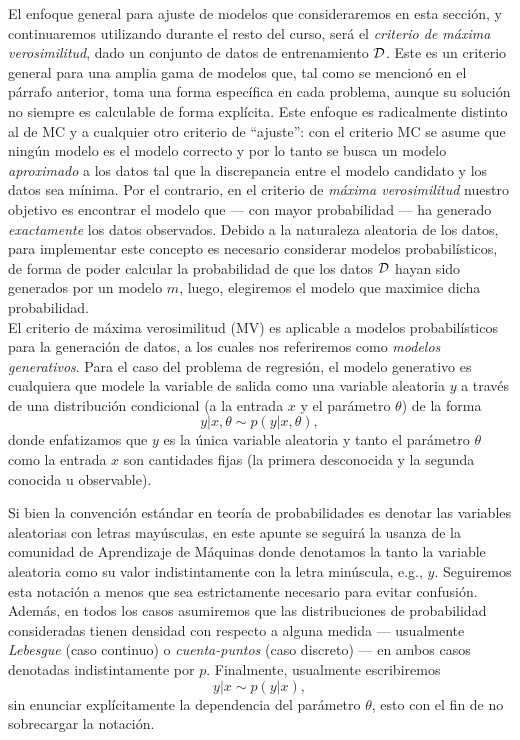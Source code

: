 El enfoque general para ajuste de modelos que consideraremos en esta sección, y continuaremos utilizando durante el resto del curso, será el \emph{criterio  de máxima verosimilitud}, dado un conjunto de datos de entrenamiento ${\mathcal D}$. Este es un criterio general para una amplia gama de modelos que, tal como se mencionó en el párrafo anterior, toma una  forma específica en cada problema, aunque su solución no siempre es calculable de forma explícita. Este enfoque es radicalmente distinto al de MC y a cualquier otro criterio de ``ajuste'': con el criterio MC se asume que ningún modelo es el modelo correcto y por lo tanto se busca un modelo \emph{aproximado} a los datos tal que la discrepancia entre el modelo candidato y los datos sea mínima. Por el contrario, en el criterio de \emph{máxima verosimilitud} nuestro objetivo es encontrar el modelo que --- con mayor probabilidad --- ha generado \emph{exactamente} los datos observados. Debido a la naturaleza aleatoria de los datos, para implementar este concepto es necesario considerar modelos probabilísticos, de forma de poder calcular la probabilidad de que los datos ${\mathcal D}$ hayan sido generados por un modelo $m$, luego, elegiremos  el modelo que maximice dicha probabilidad. \\

El criterio de máxima verosimilitud (MV) es aplicable a modelos probabilísticos para la generación de datos, a los cuales nos referiremos como \emph{modelos generativos}. Para el caso del problema de regresión, el modelo generativo es cualquiera que modele la variable de salida como una variable aleatoria $y$ a través de una distribución condicional (a la entrada $x$ y el parámetro $\theta$) de la forma 
\begin{equation}
	y|x,\theta \sim p(y|x,\theta),\label{eq:mod_gen}
\end{equation}
donde enfatizamos que $y$ es  la única variable aleatoria y tanto el parámetro $\theta$ como la entrada $x$ son cantidades fijas (la primera desconocida y la segunda conocida u observable).

\begin{mdframed}[style=discusion, frametitle={\center Notación sobre variables aleatorias}]
 Si bien la convención estándar en teoría de probabilidades es denotar las variables aleatorias con letras mayúsculas, en este apunte se seguirá la usanza de la comunidad de Aprendizaje de Máquinas donde denotamos la tanto la variable aleatoria como su valor indistintamente con la letra minúscula, e.g., $y$. Seguiremos esta notación a menos que sea estrictamente necesario para evitar confusión. Además, en todos los casos asumiremos que las distribuciones de probabilidad consideradas tienen densidad con respecto a alguna medida --- usualmente \emph{Lebesgue} (caso continuo) o \emph{cuenta-puntos} (caso discreto) --- en ambos casos denotadas indistintamente por $p$.  Finalmente, usualmente escribiremos 
  \begin{equation}
  	y|x \sim p(y|x),
  \end{equation}
  sin enunciar explícitamente la dependencia del parámetro $\theta$, esto con el fin de no sobrecargar la notación.
\end{mdframed}


